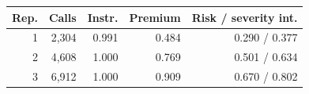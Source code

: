 \begin{tabular}{rrrrr}
\toprule
Rep. & Calls & Instr. & Premium & Risk / severity int. \\
\midrule
1 & 2,304 & 0.991 & 0.484 & 0.290 / 0.377 \\
2 & 4,608 & 1.000 & 0.769 & 0.501 / 0.634 \\
3 & 6,912 & 1.000 & 0.909 & 0.670 / 0.802 \\
\bottomrule
\end{tabular}
